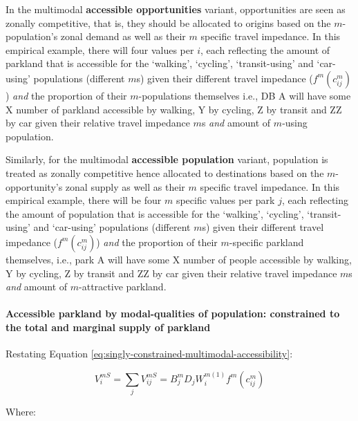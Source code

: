 \documentclass[
11pt, %
oneside, %
english, %
singlespacing, %
]{macthesis} %
\begin{document}
In the multimodal \textbf{accessible opportunities} variant, opportunities are seen as zonally competitive, that is, they should be allocated to origins based on the \(m\)-population's zonal demand as well as their \(m\) specific travel impedance. In this empirical example, there will four values per \(i\), each reflecting the amount of parkland that is accessible for the `walking', `cycling', `transit-using' and `car-using' populations (different \(m\)s) given their different travel impedance (\(f^m(c^m_{ij})\)) \emph{and} the proportion of their \(m\)-populations themselves i.e., DB A will have some X number of parkland accessible by walking, Y by cycling, Z by transit and ZZ by car given their relative travel impedance \(m\)s \emph{and} amount of \(m\)-using population.

Similarly, for the multimodal \textbf{accessible population} variant, population is treated as zonally competitive hence allocated to destinations based on the \(m\)-opportunity's zonal supply as well as their \(m\) specific travel impedance. In this empirical example, there will be four \(m\) specific values per park \(j\), each reflecting the amount of population that is accessible for the `walking', `cycling', `transit-using' and `car-using' populations (different \(m\)s) given their different travel impedance (\(f^m(c^m_{ij})\)) \emph{and} the proportion of their \(m\)-specific parkland themselves, i.e., park A will have some X number of people accessible by walking, Y by cycling, Z by transit and ZZ by car given their relative travel impedance \(m\)s \emph{and} amount of \(m\)-attractive parkland.

\paragraph{Accessible parkland by modal-qualities of population: constrained to the total and marginal supply of parkland}\label{accessible-parkland-by-modal-qualities-of-population-constrained-to-the-total-and-marginal-supply-of-parkland}

Restating Equation \ref{eq:singly-constrained-multimodal-accessibility}:

\begin{equation}
\label{eq:singly-constrained-multimodal-accessibility}
V^{mS}_{i} = \sum_j V^{mS}_{ij} = B_j^{m} D_j W_i^{m(1)} f^m(c^m_{ij})
\end{equation} 

Where:
\end{document}
